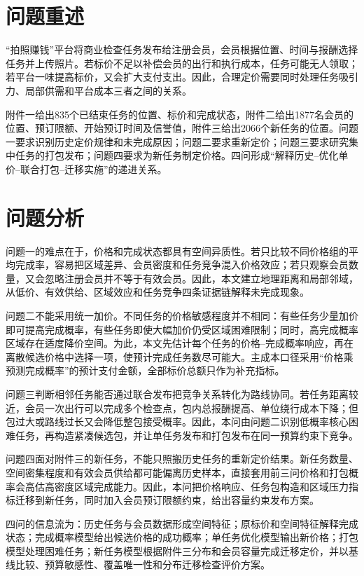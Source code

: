 ﻿\documentclass[UTF8,zihao=-4,a4paper,fontset=fandol]{ctexart}
\begin{document}
\CumcmBodyStart

\section{问题重述}

“拍照赚钱”平台将商业检查任务发布给注册会员，会员根据位置、时间与报酬选择任务并上传照片。若标价不足以补偿会员的出行和执行成本，任务可能无人领取；若平台一味提高标价，又会扩大支付支出。因此，合理定价需要同时处理任务吸引力、局部供需和平台成本三者之间的关系。

附件一给出835个已结束任务的位置、标价和完成状态，附件二给出1877名会员的位置、预订限额、开始预订时间及信誉值，附件三给出2066个新任务的位置。问题一要求识别历史定价规律和未完成原因；问题二要求重新定价；问题三要求研究集中任务的打包发布；问题四要求为新任务制定价格。四问形成“解释历史--优化单价--联合打包--迁移实施”的递进关系。

\section{问题分析}

问题一的难点在于，价格和完成状态都具有空间异质性。若只比较不同价格组的平均完成率，容易把区域差异、会员密度和任务竞争混入价格效应；若只观察会员数量，又会忽略注册会员并不等于有效会员。因此，本文建立地理距离和局部邻域，从低价、有效供给、区域效应和任务竞争四条证据链解释未完成现象。

问题二不能采用统一加价。不同任务的价格敏感程度并不相同：有些任务少量加价即可提高完成概率，有些任务即使大幅加价仍受区域困难限制；同时，高完成概率区域存在适度降价空间。为此，本文先估计每个任务的价格--完成概率响应，再在离散候选价格中选择一项，使预计完成任务数尽可能大。主成本口径采用“价格乘预测完成概率”的预计支付金额，全部标价总额只作为补充指标。

问题三判断相邻任务能否通过联合发布把竞争关系转化为路线协同。若任务距离较近，会员一次出行可以完成多个检查点，包内总报酬提高、单位绕行成本下降；但包过大或路线过长又会降低整包接受概率。因此，本问由问题二识别低概率核心困难任务，再构造紧凑候选包，并让单任务发布和打包发布在同一预算约束下竞争。

问题四面对附件三的新任务，不能只照搬历史任务的重新定价结果。新任务数量、空间密集程度和有效会员供给都可能偏离历史样本，直接套用前三问价格和打包概率会高估高密度区域完成能力。因此，本问把价格响应、任务包构造和区域压力指标迁移到新任务，同时加入会员预订限额约束，给出容量约束发布方案。

四问的信息流为：历史任务与会员数据形成空间特征；原标价和空间特征解释完成状态；完成概率模型给出候选价格的成功概率；单任务优化模型输出新价格；打包模型处理困难任务；新任务模型根据附件三分布和会员容量完成迁移定价，并以基线比较、预算敏感性、覆盖唯一性和分布迁移检查评价方案。
\end{document}
